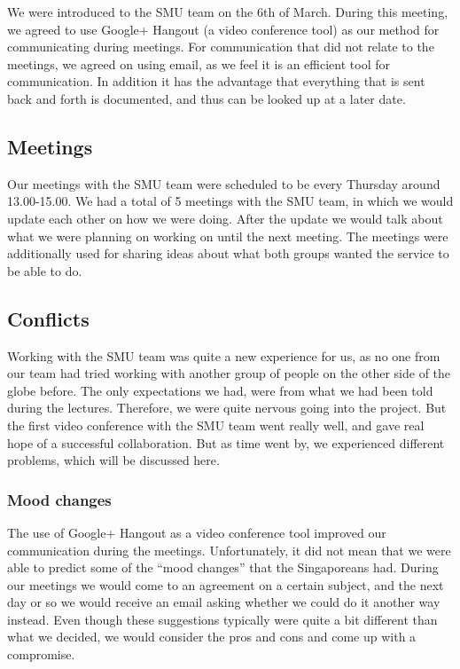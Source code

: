 We were introduced to the SMU team on the 6th of March. During this meeting, we agreed to use Google+ Hangout (a video conference tool) as our method for communicating during meetings. For communication that did not relate to the meetings, we agreed on using email, as we feel it is an efficient tool for communication. In addition it has the advantage that everything that is sent back and forth is documented, and thus can be looked up at a later date.

\subsection{Meetings}
\label{Collaboration_SMU_Meetings}
Our meetings with the SMU team were scheduled to be every Thursday around 13.00-15.00. We had a total of 5 meetings with the SMU team, in which we would update each other on how we were doing. After the update we would talk about what we were planning on working on until the next meeting. The meetings were additionally used for sharing ideas about what both groups wanted the service to be able to do.

\subsection{Conflicts}
\label{Collaboration_SMU_Conflicts}
Working with the SMU team was quite a new experience for us, as no one from our team had tried working with another group of people on the other side of the globe before. The only expectations we had, were from what we had been told during the lectures. Therefore, we were quite nervous going into the project. But the first video conference with the SMU team went really well, and gave real hope of a successful collaboration. But as time went by, we experienced different problems, which will be discussed here.

\subsubsection{Mood changes}
\label{Collaboration_SMU_ConflictsMood}
The use of Google+ Hangout as a video conference tool improved our communication during the meetings. Unfortunately, it did not mean that we were able to predict some of the ``mood changes'' that the Singaporeans had. During our meetings we would come to an agreement on a certain subject, and the next day or so we would receive an email asking whether we could do it another way instead. Even though these suggestions typically were quite a bit different than what we decided, we would consider the pros and cons and come up with a compromise.

